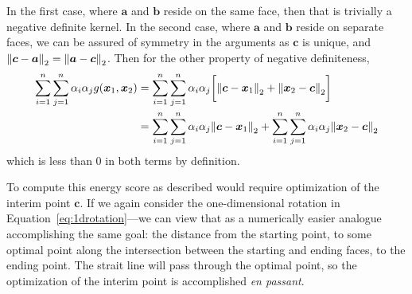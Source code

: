 In the first case, where $\bm{a}$ and $\bm{b}$ reside on the same face, then that is trivially a
  negative definite kernel.  In the second case, where $\bm{a}$ and $\bm{b}$ reside on separate
  faces, we can be assured of symmetry in the arguments as $\bm{c}$ is unique, and $\pnorm{\bm{c} - \bm{a}}{2} = \pnorm{\bm{a} - \bm{c}}{2}$.  Then for the other property of negative definiteness,
  \begin{equation*}
    \begin{aligned}
      \sum_{i = 1}^n\sum_{j = 1}^n \alpha_i\alpha_j g(\bm{x}_1,\bm{x}_2) &= \sum_{i = 1}^n\sum_{j = 1}^n \alpha_i\alpha_j \bigg[\pnorm{\bm{c} - \bm{x}_1}{2} + \pnorm{\bm{x}_2 - \bm{c}}{2}\bigg]\\
      &= \sum_{i = 1}^n\sum_{j = 1}^n \alpha_i\alpha_j\pnorm{\bm{c} - \bm{x}_1}{2} + \sum_{i = 1}^n\sum_{j = 1}^n \alpha_i\alpha_j\pnorm{\bm{x}_2 - \bm{c}}{2}
    \end{aligned}
  \end{equation*}
  which is less than $0$ in both terms by definition.

To compute this energy score as described would require optimization of the interim point $\bm{c}$.
  If we again consider the one-dimensional rotation in Equation~\ref{eq:1drotation}---we
  can view that as a numerically easier analogue accomplishing the same goal: the distance from
  the starting point, to some optimal point along the intersection between the starting and
  ending faces, to the ending point.  The strait line will pass through the optimal point, so
  the optimization of the interim point is accomplished \emph{en passant}.

